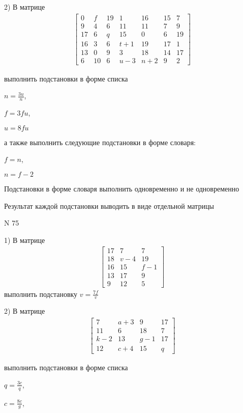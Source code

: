 \documentclass[11pt]{report}
\begin{document}
    2) В матрице
\begin{align*}
\left[\begin{matrix}0 & f & 19 & 1 & 16 & 15 & 7\\9 & 4 & 6 & 11 & 11 & 7 & 9\\17 & 6 & q & 15 & 0 & 6 & 19\\16 & 3 & 6 & t + 1 & 19 & 17 & 1\\13 & 0 & 9 & 3 & 18 & 14 & 17\\6 & 10 & 6 & u - 3 & n + 2 & 9 & 2\end{matrix}\right]
\end{align*}

выполнить подстановки в форме списка

$n=\frac{3 u}{n}$,

$f=3 f u$,

$u=8 f u$

а также выполнить следующие подстановки в форме словаря:

$f=n$,

$n=f - 2$


    Подстановки в форме словаря выполнить одновременно и не одновременно


    Результат каждой подстановки выводить в виде отдельной матрицы

\newpage
N 75


    1) В матрице
\begin{align*}
\left[\begin{matrix}17 & 7 & 7\\18 & v - 4 & 19\\16 & 15 & f - 1\\13 & 17 & 9\\9 & 12 & 5\end{matrix}\right]
\end{align*}
выполнить подстановку $v=\frac{7 f}{v}$


    2) В матрице
\begin{align*}
\left[\begin{matrix}7 & a + 3 & 9 & 17\\11 & 6 & 18 & 7\\k - 2 & 13 & g - 1 & 17\\12 & c + 4 & 15 & q\end{matrix}\right]
\end{align*}

выполнить подстановки в форме списка

$q=\frac{3 c}{q}$,

$c=\frac{8 c}{g}$,
\end{document}

